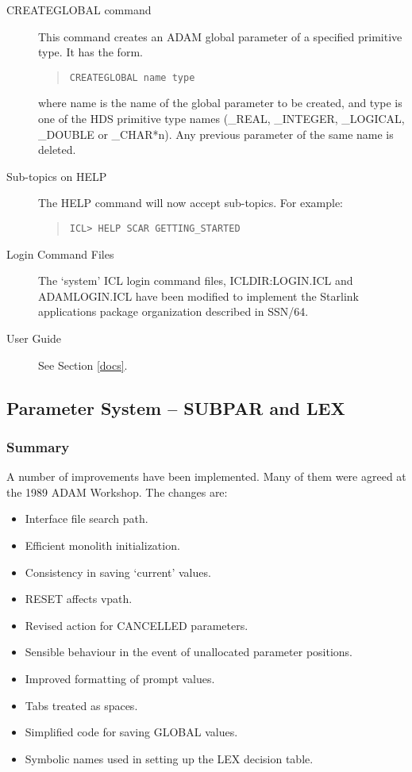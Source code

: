\begin{description}
\item[CREATEGLOBAL command]
This command creates an ADAM global parameter of a specified primitive type.
It has the form.
\begin{quote}
\begin{verbatim}
CREATEGLOBAL name type
\end{verbatim}
\end{quote}
where name is the name of the global parameter to be created, and type
is one of the HDS primitive type names (\_REAL, \_INTEGER, \_LOGICAL, 
\_DOUBLE or \_CHAR*n). Any previous parameter of the same name is deleted.

\item[Sub-topics on HELP]
The HELP command will now accept sub-topics.
For example:
\begin{quote}
\begin{verbatim}
ICL> HELP SCAR GETTING_STARTED
\end{verbatim}
\end{quote}

\item[Login Command Files]
The `system' ICL login command files, ICLDIR:LOGIN.ICL and ADAM\-LOG\-IN\-.ICL
have been modified to implement the Starlink applications package organization
described in SSN/64.
\item[User Guide]
See Section \ref{docs}.
\end{description}

\subsection{Parameter System -- SUBPAR and LEX}
\subsubsection{Summary}
A number of improvements have been implemented. Many of them were agreed at
the 1989 ADAM Workshop.
The changes are:
\begin{itemize}
\item Interface file search path.
\item Efficient monolith initialization.
\item Consistency in saving `current' values. 
\item RESET affects vpath.
\item Revised action for CANCELLED parameters.
\item Sensible behaviour in the event of unallocated parameter positions.
\item Improved formatting of prompt values.
\item Tabs treated as spaces.
\item Simplified code for saving GLOBAL values.
\item Symbolic names used in setting up the LEX decision table.
\end{itemize}

